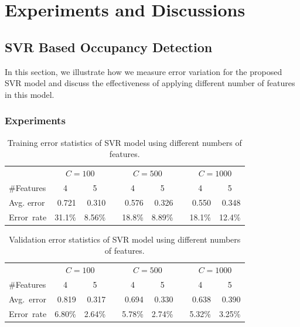 \section{Experiments and Discussions}
\label{sec:results}
\subsection{SVR Based Occupancy Detection}
In this section, we illustrate how we measure error variation for
the proposed SVR model and discuss the effectiveness of applying
different number of features in this model.

\subsubsection{Experiments}

\begin{table}[!h]
\centering
    \begin{tabular}{lrrcrrcrr}
        \toprule
            & \multicolumn{2}{c}{$C=100$} && \multicolumn{2}{c}{$C=500$} && \multicolumn{2}{c}{$C=1000$} \\
        \cmidrule{2-3} \cmidrule{5-6} \cmidrule{8-9}
        \#Features &   \multicolumn{1}{c}{4} & \multicolumn{1}{c}{5} && \multicolumn{1}{c}{4} & \multicolumn{1}{c}{5} && \multicolumn{1}{c}{4} & \multicolumn{1}{c}{5}  \\
        \midrule
        Avg. error&0.721& 0.310   && 0.576 &  0.326   &&  0.550  &  0.348        \\
        Error~rate&31.1\%& 8.56\%  && 18.8\% &  8.89\%  &&  18.1\%  &  12.4\%        \\
        \bottomrule
    \end{tabular}
\label{table:training}
\caption{Training error statistics of SVR model using different numbers of features.}
\end{table}

\begin{table}[!h]
    \centering
    \begin{tabular}{lrrcrrcrr}
        \toprule
            & \multicolumn{2}{c}{$C=100$} && \multicolumn{2}{c}{$C=500$} && \multicolumn{2}{c}{$C=1000$} \\
        \cmidrule{2-3} \cmidrule{5-6} \cmidrule{8-9}
        \#Features &   \multicolumn{1}{c}{4} & \multicolumn{1}{c}{5} && \multicolumn{1}{c}{4} & \multicolumn{1}{c}{5} && \multicolumn{1}{c}{4} & \multicolumn{1}{c}{5}  \\
        \midrule
        Avg.~error&0.819& 0.317   && 0.694  &  0.330   &&  0.638  &  0.390        \\
        Error~rate&6.80\%& 2.64\%  && 5.78\% &  2.74\%  &&  5.32\%  &  3.25\%        \\
        \bottomrule
    \end{tabular}
    \caption{Validation error statistics of SVR model using different numbers of features.}
    \label{table:testing}
\end{table}

